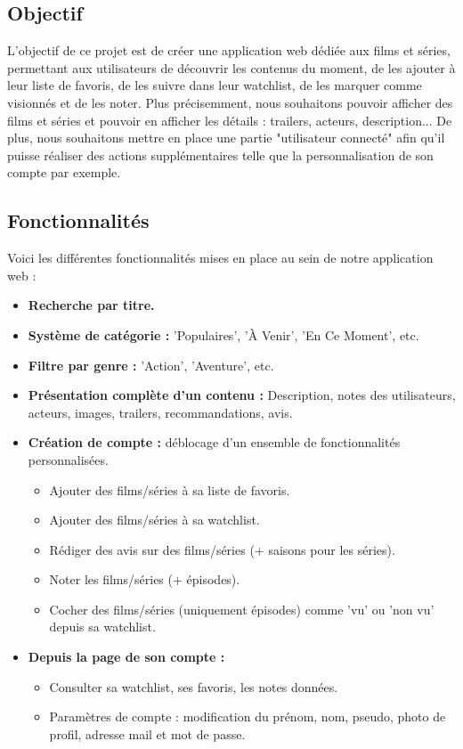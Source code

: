 \documentclass[a4paper]{article}
\begin{document}
\subsection{Objectif}
L'objectif de ce projet est de créer une application web dédiée aux films et séries, permettant aux utilisateurs de découvrir les contenus du moment, de les ajouter à leur liste de favoris, de les suivre dans leur watchlist, de les marquer comme visionnés et de les noter. Plus précisemment, nous souhaitons pouvoir afficher des films et séries et pouvoir en afficher les détails : trailers, acteurs, description... De plus, nous souhaitons mettre en place une partie "utilisateur connecté" afin qu'il puisse réaliser des actions supplémentaires telle que la personnalisation de son compte par exemple.

\subsection{Fonctionnalités}
    Voici les différentes fonctionnalités mises en place au sein de notre application web :\newline 
    \begin{itemize}
    \item \textbf{Recherche par titre.}
    \item \textbf{Système de catégorie :} 'Populaires', 'À Venir', 'En Ce Moment', etc.
    \item \textbf{Filtre par genre :} 'Action', 'Aventure', etc.
    \item \textbf{Présentation complète d’un contenu :} Description, notes des utilisateurs, acteurs, images, trailers, recommandations, avis.
    \item \textbf{Création de compte :} déblocage d’un ensemble de fonctionnalités personnalisées.
    \begin{itemize}[label=\textbullet]
        \item Ajouter des films/séries à sa liste de favoris.
        \item Ajouter des films/séries à sa watchlist.
        \item Rédiger des avis sur des films/séries (+ saisons pour les séries).
        \item Noter les films/séries (+ épisodes).
        \item Cocher des films/séries (uniquement épisodes) comme 'vu' ou 'non vu' depuis sa watchlist.
    \end{itemize}
    \item \textbf{Depuis la page de son compte :}
    \begin{itemize}[label=\textbullet]
        \item Consulter sa watchlist, ses favoris, les notes données.
        \item Paramètres de compte : modification du prénom, nom, pseudo, photo de profil, adresse mail et mot de passe.
    \end{itemize}
\end{itemize}
\end{document}
